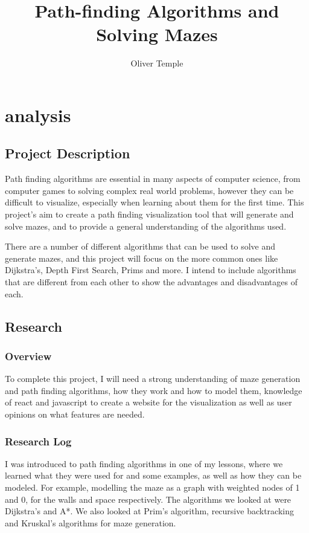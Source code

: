 \documentclass[titlepage]{article}
\title{Path-finding Algorithms and Solving Mazes}
\author{Oliver Temple}
\begin{document}
\maketitle
\tableofcontents

\section{analysis}
\subsection{Project Description}
Path finding algorithms are essential in many aspects of computer science, from computer games to solving complex real world problems, however they can be difficult to visualize, especially when learning about them for the first time. This project's aim to create a path finding visualization tool that will generate and solve mazes, and to provide a general understanding of the algorithms used. 

There are a number of different algorithms that can be used to solve and generate mazes, and this project will focus on the more common ones like Dijkstra's, Depth First Search, Prims and more. I intend to include algorithms that are different from each other to show the advantages and disadvantages of each.

\subsection{Research}
\subsubsection{Overview}
To complete this project, I will need a strong understanding of maze generation and path finding algorithms, how they work and how to model them, knowledge of react and javascript to create a website for the visualization as well as user opinions on what features are needed.
\subsubsection{Research Log}
I was introduced to path finding algorithms in one of my lessons, where we learned what they were used for and some examples, as well as how they can be modeled. For example, modelling the maze as a graph with weighted nodes of 1 and 0, for the walls and space respectively. The algorithms we looked at were Dijkstra's and A*. We also looked at Prim's algorithm, recursive backtracking and Kruskal's algorithms for maze generation.
\end{document}

